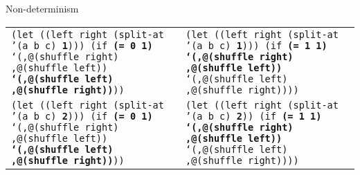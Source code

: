 \begin{frame}{Non-determinism}
  \tiny
  \begin{tabularx}{\textwidth}{ X X }
    \texttt{(let ((left right (split-at '(a b c)\newline
      \hphantom{\_\_\_\_\_\_\_\_\_\_\_\_\_\_\_\_\_\_\_}
      \textbf{1})))\newline
      \hphantom{\_\_}(if \textbf{(= 0 1)}\newline
      \hphantom{\_\_\_\_\_\_}`(,@(shuffle right)\newline
      \hphantom{ \_\_\_\_\_\_\_},@(shuffle left))\newline
      \hphantom{ \_\_\_\_}\textbf{`(,@(shuffle left)\newline
      \hphantom{ \_\_\_\_\_\_},@(shuffle right))}))\newline
      \ 
    }
    &
    \texttt{(let ((left right (split-at '(a b c)\newline
      \hphantom{\_\_\_\_\_\_\_\_\_\_\_\_\_\_\_\_\_\_\_}
      \textbf{1})))\newline
      \hphantom{\_\_}(if \textbf{(= 1 1)}\newline
      \hphantom{\_\_\_\_\_\_}\textbf{`(,@(shuffle right)\newline
      \hphantom{ \_\_\_\_\_\_\_},@(shuffle left))}\newline
      \hphantom{ \_\_\_\_}`(,@(shuffle left)\newline
      \hphantom{ \_\_\_\_\_\_},@(shuffle right))))\newline
      \ 
    }

    \\
    
    \texttt{(let ((left right (split-at '(a b c)\newline
      \hphantom{\_\_\_\_\_\_\_\_\_\_\_\_\_\_\_\_\_\_\_}
      \textbf{2})))\newline
      \hphantom{\_\_}(if \textbf{(= 0 1)}\newline
      \hphantom{\_\_\_\_\_\_}`(,@(shuffle right)\newline
      \hphantom{ \_\_\_\_\_\_\_},@(shuffle left))\newline
      \hphantom{ \_\_\_\_}\textbf{`(,@(shuffle left)\newline
      \hphantom{ \_\_\_\_\_\_},@(shuffle right))}))\newline
      \ 
    }
    &
    \texttt{(let ((left right (split-at '(a b c)\newline
      \hphantom{\_\_\_\_\_\_\_\_\_\_\_\_\_\_\_\_\_\_\_}
      \textbf{2}))\newline
      \hphantom{\_\_}(if \textbf{(= 1 1)}\newline
      \hphantom{\_\_\_\_\_\_}\textbf{`(,@(shuffle right)\newline
      \hphantom{ \_\_\_\_\_\_\_},@(shuffle left))}\newline
      \hphantom{ \_\_\_\_}`(,@(shuffle left)\newline
      \hphantom{ \_\_\_\_\_\_},@(shuffle right))))\newline
      \ 
    }

  \end{tabularx}
\end{frame}
